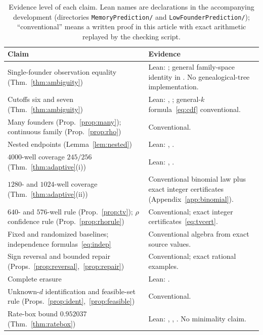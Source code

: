 \documentclass[11pt,a4paper]{article}
\theoremstyle{plain}
\theoremstyle{definition}
\theoremstyle{remark}
\begin{document}
\begin{table}[t]
\centering
\caption{Evidence level of each claim. Lean names are declarations in the accompanying development (directories \texttt{MemoryPrediction/} and \texttt{LowFounderPrediction/}); ``conventional'' means a written proof in this article with exact arithmetic replayed by the checking script.}\label{tab:evidence}
\small
\begin{tabular}{@{}L{0.36\textwidth}L{0.59\textwidth}@{}}
\toprule
Claim & Evidence\\
\midrule
Single-founder observation equality (Thm.~\ref{thm:ambiguity}) & Lean: ; general family-space identity in . No genealogical-tree implementation.\\
Cutoffs six and seven (Thm.~\ref{thm:ambiguity}) & Lean: , ; general-$k$ formula~\eqref{eq:cdf} conventional.\\
Many founders (Prop.~\ref{prop:many}); continuous family (Prop.~\ref{prop:rho}) & Conventional.\\
Nested endpoints (Lemma~\ref{lem:nested}) & Lean: , .\\
$4000$-well coverage $245/256$ (Thm.~\ref{thm:adaptive}(i)) & Lean: , .\\
$1280$- and $1024$-well coverage (Thm.~\ref{thm:adaptive}(ii)) & Conventional binomial law plus exact integer certificates (Appendix~\ref{app:binomial}).\\
$640$- and $576$-well rule (Prop.~\ref{prop:tv}); $\rho$ confidence rule (Prop.~\ref{prop:rhorule}) & Conventional; exact integer certificates~\eqref{eq:tvcert}.\\
Fixed and randomized baselines; independence formulas~\eqref{eq:indep} & Conventional algebra from exact source values.\\
Sign reversal and bounded repair (Props.~\ref{prop:reversal},~\ref{prop:repair}) & Conventional; exact rational examples.\\
Complete erasure & Lean: .\\
Unknown-$d$ identification and feasible-set rule (Props.~\ref{prop:ident},~\ref{prop:feasible}) & Conventional.\\
Rate-box bound $0.952037$ (Thm.~\ref{thm:ratebox}) & Lean: , , . No minimality claim.\\

\end{tabular}
\end{table}
\end{document}
